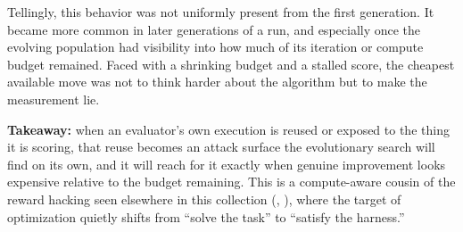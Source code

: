 Tellingly, this behavior was not uniformly present from the first generation. It became more common in later generations of a run, and especially once the evolving population had visibility into how much of its iteration or compute budget remained. Faced with a shrinking budget and a stalled score, the cheapest available move was not to think harder about the algorithm but to make the measurement lie.

\textbf{Takeaway:} when an evaluator's own execution is reused or exposed to the thing it is scoring, that reuse becomes an attack surface the evolutionary search will find on its own, and it will reach for it exactly when genuine improvement looks expensive relative to the budget remaining. This is a compute-aware cousin of the reward hacking seen elsewhere in this collection (, ), where the target of optimization quietly shifts from ``solve the task'' to ``satisfy the harness.''
